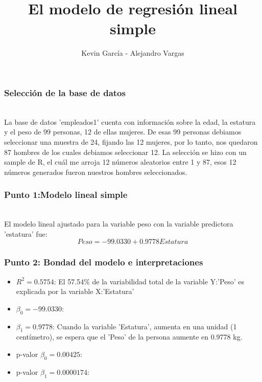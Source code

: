 \documentclass[12pt]{beamer}
\author{Kevin García - Alejandro Vargas}
\title{El modelo de regresión lineal simple}
\begin{document}
\begin{frame}
\titlepage
\end{frame}

\begin{frame}
\frametitle{Selección de la base de datos}
~\\La base de datos 'empleados1' cuenta con información sobre la edad, la estatura y el peso
de 99 personas, 12 de ellas mujeres. De esas 99 personas debiamos seleccionar una muestra de 24, fijando las 12 mujeres, por lo tanto, nos quedaron 87 hombres de los cuales debiamos seleccionar 12. La selección se hizo con un sample de R, el cuál me arroja 12 números aleatorios entre 1 y 87, esos 12 números generados fueron nuestros hombres seleccionados.
\end{frame}

\begin{frame}
\frametitle{Punto 1:Modelo lineal simple}
~\\ El modelo lineal ajustado para la variable peso con la variable predictora 'estatura' fue:
~\\ $$Peso=-99.0330+0.9778 Estatura$$

\end{frame}

\begin{frame}
\frametitle{Punto 2: Bondad del modelo e interpretaciones}
\begin{itemize}
\item $R^2=0.5754$: El 57.54\% de la variabilidad total de la variable Y:'Peso' es explicada por la variable X:'Estatura'
\item $\beta_{0}=-99.0330$:
\item $\beta_{1}=0.9778$: Cuando la variable 'Estatura', aumenta en una unidad (1 centímetro), se espera que el 'Peso' de la persona aumente en 0.9778 kg.
\item p-valor $\beta_{0}=0.00425$:
\item p-valor $\beta_{1}=0.0000174$:
\end{itemize}
\end{frame}
\end{document}
